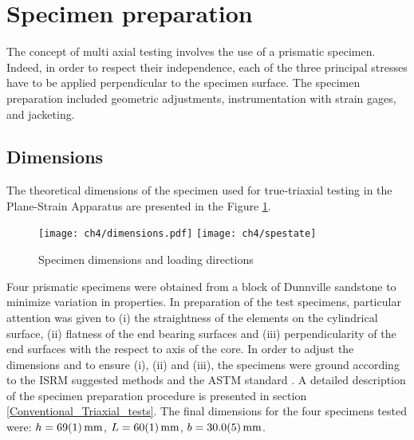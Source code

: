 


\section{Specimen preparation}

The concept of multi axial testing involves the use of a prismatic specimen. Indeed, in order to respect their independence, each of the three principal stresses have to be applied perpendicular to the specimen surface. The specimen preparation included geometric adjustments, instrumentation with strain gages, and jacketing. 

\subsection{Dimensions}

The theoretical dimensions of the specimen used for true-triaxial testing in the Plane-Strain Apparatus are presented in the Figure \ref{fig4:5}. 

\begin{figure}[tb]
    \centering
    \texttt{[image: ch4/dimensions.pdf]}
    \texttt{[image: ch4/spestate]}
    \captionsetup{justification=centering}
    \caption{Specimen dimensions and loading directions}
    \label{fig4:5}
\end{figure} 

Four prismatic specimens were obtained from a block of Dunnville sandstone to minimize variation in properties. In preparation of the test specimens, particular attention was given to (i) the straightness of the elements on the cylindrical surface, (ii) flatness of the end bearing surfaces and (iii) perpendicularity of the end surfaces with the respect to axis of the core. In order to adjust the dimensions and to ensure (i), (ii) and (iii), the specimens were ground according to the ISRM suggested methods \cite{ISRM2015} and the ASTM standard \cite{ASTM2019}. A detailed description of the specimen preparation procedure is presented in section \ref{Conventional_Triaxial_tests}. The final dimensions for the four specimens tested were: $h=\SI{69+-1}{\milli\meter}$, $L=\SI{60+-1}{\milli\meter}$, 
$b=\SI{30+-0.5}{\milli\meter}$.


